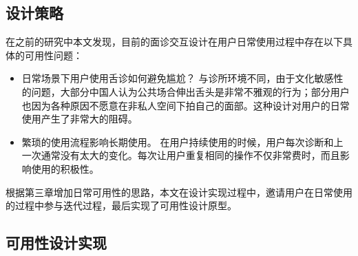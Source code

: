 \subsection{设计策略}
在之前的研究中本文发现，目前的面诊交互设计在用户日常使用过程中存在以下具体的可用性问题：
\begin{itemize}
    \item 日常场景下用户使用舌诊如何避免尴尬？
    与诊所环境不同，由于文化敏感性的问题，大部分中国人认为公共场合伸出舌头是非常不雅观的行为；部分用户也因为各种原因不愿意在非私人空间下拍自己的面部。这种设计对用户的日常使用产生了非常大的阻碍。
    \item 繁琐的使用流程影响长期使用。
    在用户持续使用的时候，用户每次诊断和上一次通常没有太大的变化。每次让用户重复相同的操作不仅非常费时，而且影响使用的积极性。
\end{itemize}

根据第三章增加日常可用性的思路，本文在设计实现过程中，邀请用户在日常使用的过程中参与迭代过程，最后实现了可用性设计原型。

\subsection{可用性设计实现}

